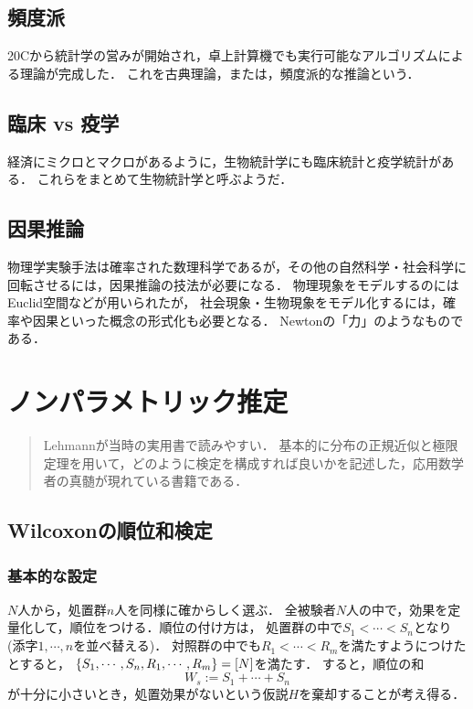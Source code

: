 \documentclass[uplatex,dvipdfmx]{jsreport}
\begin{document}
\section{頻度派}

20Cから統計学の営みが開始され，卓上計算機でも実行可能なアルゴリズムによる理論が完成した．
これを古典理論，または，頻度派的な推論という．

\section{臨床 vs 疫学}

経済にミクロとマクロがあるように，生物統計学にも臨床統計と疫学統計がある．
これらをまとめて生物統計学と呼ぶようだ．

\section{因果推論}

物理学実験手法は確率された数理科学であるが，その他の自然科学・社会科学に
回転させるには，因果推論の技法が必要になる．
物理現象をモデルするのにはEuclid空間などが用いられたが，
社会現象・生物現象をモデル化するには，確率や因果といった概念の形式化も必要となる．
Newtonの「力」のようなものである．

\chapter{ノンパラメトリック推定}

\begin{quotation}
    Lehmann\cite{Lehmann}が当時の実用書で読みやすい．
    基本的に分布の正規近似と極限定理を用いて，どのように検定を構成すれば良いかを記述した，応用数学者の真髄が現れている書籍である．
\end{quotation}

\section{Wilcoxonの順位和検定}

\subsection{基本的な設定}

$N$人から，処置群$n$人を同様に確からしく選ぶ．
全被験者$N$人の中で，効果を定量化して，順位をつける．順位の付け方は，
処置群の中で$S_1<\cdots<S_n$となり(添字$1,\cdots,n$を並べ替える)．
対照群の中でも$R_1<\cdots<R_m$を満たすようにつけたとすると，
$\left\{S_1,\cdots,S_n,R_1,\cdots,R_m\right\}=[N]$を満たす．
すると，順位の和
\[W_s:=S_1+\cdots+S_n\]
が十分に小さいとき，処置効果がないという仮説$H$を棄却することが考え得る．
\end{document}
